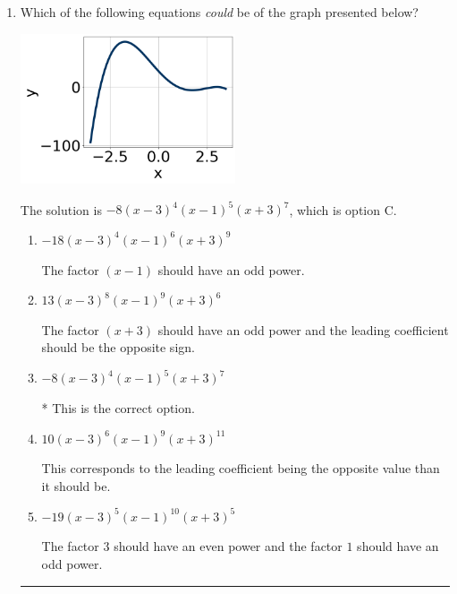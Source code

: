 \documentclass{extbook}[14pt]
\newcommand{\litem}[1]{\item #1

\rule{\textwidth}{0.4pt}}
\begin{document}
\begin{enumerate}\litem{
Which of the following equations \textit{could} be of the graph presented below?

\begin{center}
    \includegraphics[width=0.5\textwidth]{../Figures/polyGraphToFunctionCopyC.png}
\end{center}


The solution is \( -8(x - 3)^{4} (x - 1)^{5} (x + 3)^{7} \), which is option C.\begin{enumerate}[label=\Alph*.]
\item \( -18(x - 3)^{4} (x - 1)^{6} (x + 3)^{9} \)

The factor $(x - 1)$ should have an odd power.
\item \( 13(x - 3)^{8} (x - 1)^{9} (x + 3)^{6} \)

The factor $(x + 3)$ should have an odd power and the leading coefficient should be the opposite sign.
\item \( -8(x - 3)^{4} (x - 1)^{5} (x + 3)^{7} \)

* This is the correct option.
\item \( 10(x - 3)^{6} (x - 1)^{9} (x + 3)^{11} \)

This corresponds to the leading coefficient being the opposite value than it should be.
\item \( -19(x - 3)^{5} (x - 1)^{10} (x + 3)^{5} \)

The factor $3$ should have an even power and the factor $1$ should have an odd power.
\end{enumerate}

}
\end{enumerate}
\end{document}
